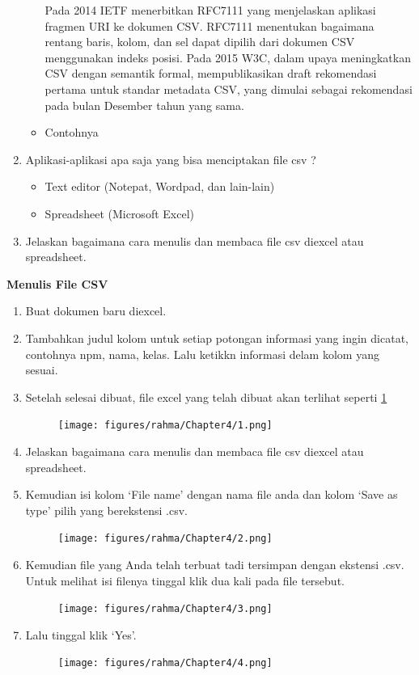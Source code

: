 \begin{enumerate}
\begin{itemize}
		 Pada 2014 IETF menerbitkan RFC7111 yang menjelaskan aplikasi fragmen URI ke dokumen CSV. RFC7111 menentukan bagaimana rentang baris, kolom, dan sel dapat dipilih dari dokumen CSV menggunakan indeks posisi. Pada 2015 W3C, dalam upaya meningkatkan CSV dengan semantik formal, mempublikasikan draft rekomendasi pertama untuk standar metadata CSV, yang dimulai sebagai rekomendasi pada bulan Desember tahun yang sama.

		\item Contohnya
			
	\end{itemize}
	\item Aplikasi-aplikasi apa saja yang bisa menciptakan file csv ?
      	\begin{itemize}
         		\item Text editor (Notepat, Wordpad, dan lain-lain)
         		\item Spreadsheet (Microsoft Excel)
       	\end{itemize}
 	\item Jelaskan bagaimana cara menulis dan membaca file csv diexcel atau spreadsheet.
\end{enumerate}
\textbf{Menulis File CSV}
\begin{enumerate}
	\item Buat dokumen baru diexcel.
       	\item Tambahkan judul kolom untuk setiap potongan informasi yang ingin dicatat, contohnya npm, nama, kelas. Lalu ketikkn informasi delam kolom yang sesuai.
	\item Setelah selesai dibuat, file excel yang telah dibuat akan terlihat seperti \ref{CSV}
		\begin{figure}[h]	\texttt{[image: figures/rahma/Chapter4/1.png]}
			\centering
        			\label{CSV}
		\end{figure}
	\item Jelaskan bagaimana cara menulis dan membaca file csv diexcel atau spreadsheet.
	\item Kemudian isi kolom `File name' dengan nama file anda dan kolom `Save as type' pilih yang berekstensi .csv.
		\begin{figure}[h] \texttt{[image: figures/rahma/Chapter4/2.png]}
			\centering
		\end{figure}
	\item Kemudian file yang Anda telah terbuat tadi tersimpan dengan ekstensi .csv. Untuk melihat isi filenya tinggal klik dua kali pada file tersebut.
		\begin{figure}[h]	\texttt{[image: figures/rahma/Chapter4/3.png]}
	         		\centering
		\end{figure}
	\item Lalu tinggal klik `Yes'.	
		\begin{figure}[h] \texttt{[image: figures/rahma/Chapter4/4.png]}
			\centering
		\end{figure}
\end{enumerate}

